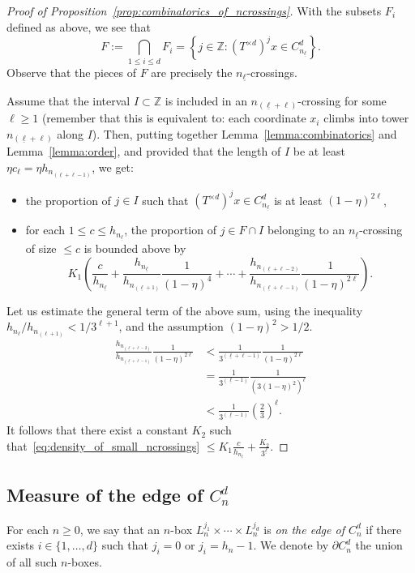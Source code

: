 \documentclass[10pt]{amsart}
\theoremstyle{definition}\newtheorem{defi}[theo]{Definition}\newtheorem{rema}[theo]{Remark}\newtheorem{exam}[theo]{Example}\newtheorem{exem}[theo]{Example}\newtheorem{nota}[theo]{Notation}
\newcommand{\egdef}{:=}
\newcommand{\ZZ}{\mathbb{Z}}
\newcommand{\cd}{C^{d}}
\newcommand{\td}{T^{\times d}}
\newcommand{\lb}{\underline{\ell}}
\begin{document}
\begin{proof}[Proof of Proposition~\ref{prop:combinatorics_of_ncrossings}]
With the subsets $F_i$ defined as above, we see that
\[
F\egdef\bigcap_{1\le i\le d}F_i = \left\{j\in\ZZ: (\td)^j x \in
\cd_{n_{\lb}} \right\}.
\]
Observe that the pieces of $F$ are precisely the $n_{\lb}$-crossings.

Assume that the interval $I\subset\ZZ$ is included in an $n_{(\lb+\ell)}$-crossing for some $\ell\ge1$ (remember that this is equivalent to: each coordinate $x_i$ climbs into tower $n_{(\lb+\ell)}$ along $I$). Then, putting together Lemma~\ref{lemma:combinatorics} and Lemma~\ref{lemma:order}, and provided that the length of $I$ be at least $\eta c_\ell=\eta h_{n_{(\lb+\ell-1)}}$, we get:
\begin{itemize}
\item the proportion of $j\in I$ such that $(\td)^j x \in \cd_{n_{\lb}}$ is at least $(1-\eta)^{2\ell}$,
\item for each $1\le c\le h_{n_{\lb}}$, the proportion of $j\in F\cap I$ belonging to an $n_{\lb}$-crossing of size $\le c$ is bounded above by
\begin{equation}\label{eq:density_of_small_ncrossings}
K_1 \left(
\frac{c}{h_{n_{\lb}}} + \frac{ h_{n_{\lb}} }{ h_{n_{(\lb+1)}} }
\frac{1}{(1-\eta)^4} + \cdots + \frac{ h_{n_{(\lb+\ell-2)}} }{ h_{n_{(\lb+\ell-1)}} }
\frac{1}{(1-\eta)^{2\ell}}
\right).
\end{equation}
\end{itemize}
Let us estimate the general term of the above sum, using the inequality $h_{n_\ell}/h_{n_{(\ell+1)}}<1/3^{\ell+1}$, and the assumption $(1-\eta)^2>1/2$.
\begin{align*}
\frac{ h_{n_{(\lb+\ell-2)}} }{ h_{n_{(\lb+\ell-1)}} }
\frac{1}{(1-\eta)^{2\ell}} & < \frac{1}{3^{(\lb+\ell-1)}} \frac{1}{(1-\eta)^{2\ell}}\\
& = \frac{1}{3^{(\lb -1)}} \frac{1}{\left(3 (1-\eta)^2
\right)^\ell}\\
& < \frac{1}{3^{(\lb -1)}} \left(\frac{2}{3}\right)^\ell.
\end{align*}
It follows that there exist a constant $K_2$ such that~\eqref{eq:density_of_small_ncrossings} $\le K_1 \frac{c}{h_{n_{\lb}}} + \frac{K_2}{3^{\lb}}$.
\end{proof}

\subsection{Measure of the edge of \texorpdfstring{$\cd_n$}{cdn}}\label{sec:edge}
For each $n\ge0$, we say that an $n$-box $L_n^{j_1}\times\cdots\times L_n^{j_d}$ is \emph{on the edge of $\cd_n$} if there exists $i\in\{1,\ldots,d\}$ such that $j_i=0$ or $j_i=h_n-1$. We denote by $\partial \cd_n$ the union of all such $n$-boxes.
\end{document}
